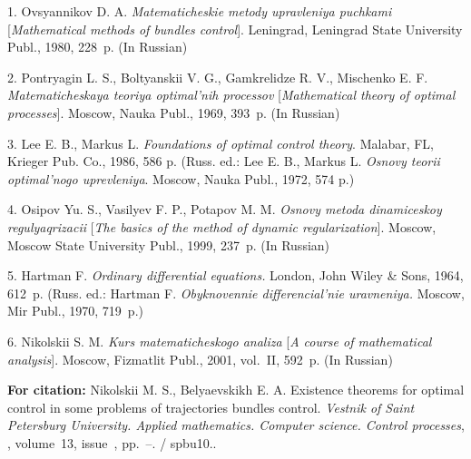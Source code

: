 

{\footnotesize

\vskip 3mm


\vskip 2mm

1. Ovsyannikov D. A.  \textit{Matematicheskie metody upravleniya
puchkami} [\textit{Mathematical methods of bundles control}].
Leningrad, Leningrad State University Publ., 1980, 228~p. (In
Russian)

2. Pontryagin L. S., Boltyanskii V. G., Gamkrelidze R. V.,
Mischenko E. F.  \textit{Matematicheskaya teoriya optimal'nih
processov} [\textit{Mathematical theory of optimal processes}].
Moscow, Nauka Publ., 1969, 393~p. (In Russian)

3. Lee E. B., Markus L.  \textit{Foundations of optimal control
theory}. Malabar, FL, Krieger Pub. Co., 1986, 586 p.  (Russ. ed.:
Lee E. B., Markus L. \textit{Osnovy teorii optimal'nogo
uprevleniya}. Moscow, Nauka Publ., 1972, 574 p.)

4. Osipov Yu. S., Vasilyev F. P., Potapov M. M.  \textit{Osnovy
metoda dinamiceskoy regulyaqrizacii} [\textit{The basics of the
method of dynamic regularization}]. Moscow, Moscow State
University Publ., 1999, 237~p. (In Russian)

5. Hartman F.  \textit{Ordinary differential equations.} London,
John Wiley \& Sons, 1964, 612~p. (Russ. ed.: Hartman F.
\textit{Obyknovennie differencial'nie uravneniya.} Moscow, Mir
Publ., 1970, 719~p.)

6. Nikolskii S. M.  \textit{Kurs matematicheskogo analiza}
[\textit{A course of mathematical analysis}]. Moscow, Fizmatlit
Publ., 2001, vol.~II, 592~p.  (In Russian)




\vskip 2mm

{\bf For citation:} Nikolskii M. S., Belyaevskikh E. A. Existence
theorems for optimal control in some problems of trajectories
bundles control. {\it Vestnik of Saint Petersburg University.
Applied mathematics. Computer science. Control processes},
\issueyear, volume~13, issue~\issuenum,
pp.~\pageref{p11}--\pageref{p11e}. \doivyp/
spbu10.\issueyear.



}
